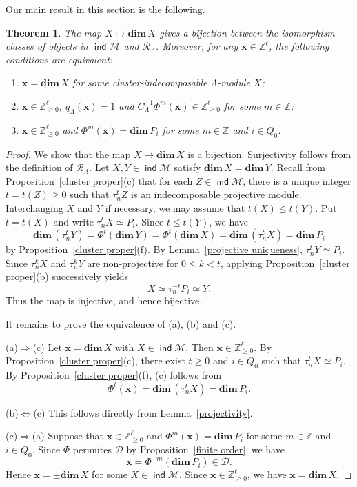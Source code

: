 \documentclass[11pt,a4paper]{amsart}
\newtheorem{theorem}{Theorem}[section]
\theoremstyle{definition}
\numberwithin{equation}{section}
\newcommand{\Z}{\mathbb{Z}}
\newcommand{\x}{\mathbf{x}}
\newcommand{\0}{\mathbf{0}}
\newcommand{\dimv}{\mathbf{dim}\,}
\DeclareMathOperator{\ind}{\mathsf{ind}}
\begin{document}
	Our main result in this section is the following.  
	
	\begin{theorem} \label{main thm}
		The map $X\mapsto \dimv X$ gives a  bijection between
		the isomorphism classes of objects  in $\ind \mathcal{M}$ 
		and $\mathcal R_\Lambda$.  		
		Moreover, for any $\x\in\mathbb Z^\ell$, the following conditions are equivalent:
		\begin{enumerate}
			\item[(a)] $\x=\dimv X$ for some cluster-indecomposable $\Lambda$-module $X$;
			\item[(b)] $\x\in\mathbb Z^\ell_{\geq 0}$, $q_\Lambda(\x)=1$ and $C_{\Lambda}^{-1}\Phi^m(\x)\in\mathbb Z^\ell_{\geq 0}$ for some $m\in \Z $;		
			\item[(c)] $\x\in\mathbb Z^\ell_{\geq 0}$ and $\Phi^m(\x)=\dimv P_i$ for some $m\in \Z$ and $i\in Q_0$.
		\end{enumerate}
	\end{theorem}
	
	\begin{proof}
		We show that the map $X\mapsto \dimv X$ is a  bijection.
		Surjectivity follows from the definition of
		$\mathcal R_\Lambda$. 
		Let $X,Y\in\ind\mathcal M$ satisfy $\dimv X=\dimv Y$. Recall from  Proposition~\ref{cluster proper}(c) that for each $Z\in \ind \mathcal{M}$, there is a unique integer $t=t(Z)\geq0$
		such that $\tau_n^{t}Z$ is an indecomposable
		projective module. 
		Interchanging $X$ and $Y$ if necessary, we may assume
		that $t(X)\leq t(Y)$.
		Put $t=t(X)$ and write $\tau_n^tX\simeq P_i$.
		Since $t\leq t(Y)$, we have
		\[
		\dimv(\tau_n^tY)
		=\Phi^t(\dimv Y)
		=\Phi^t(\dimv X)
		=\dimv(\tau_n^tX)
		=\dimv P_i
		\] by Proposition~\ref{cluster proper}(f). 
		By Lemma~\ref{projective uniqueness},
		$\tau_n^tY\simeq P_i$.
		Since $\tau_n^kX$ and $\tau_n^kY$ are non-projective
		for $0\leq k<t$, applying
		Proposition~\ref{cluster proper}(b) successively yields
		\[
		X\simeq\tau_n^{-t}P_i\simeq Y.
		\]
		Thus the map is injective, and hence  bijective.
		
		It remains to prove the equivalence of (a), (b) and (c).
		
			(a)$\Rightarrow$(c) 
		Let $\x=\dimv X$ with $X\in\ind\mathcal M$.
		Then $\x\in\Z_{\geq0}^{\ell}$.
		By Proposition~\ref{cluster proper}(c), there exist
		$t\geq0$ and $i\in Q_0$ such that
		$\tau_n^tX\simeq P_i$.
		By Proposition~\ref{cluster proper}(f), (c) follows from 
		\[
		\Phi^t(\x)=\dimv(\tau_n^tX)=\dimv P_i.
		\]
		
		
		(b)$\Leftrightarrow$(c) 
		This follows directly from Lemma~\ref{projectivity}.
		
		(c)$\Rightarrow$(a) 
		Suppose that $\x\in\Z_{\geq0}^{\ell}$ and
		$\Phi^m(\x)=\dimv P_i$ for some $m\in \Z$
		and $i\in Q_0$.
		Since $\Phi$ permutes $\mathcal D$ by
		Proposition~\ref{finite order}, we have
		\[
		\x=\Phi^{-m}(\dimv P_i)\in\mathcal D.
		\]
		Hence $\x=\pm\dimv X$ for some $X\in\ind\mathcal M$.
		Since $\x\in\Z_{\geq0}^{\ell}$,
		we have $\x=\dimv X$.
	\end{proof}
	
\end{document}

